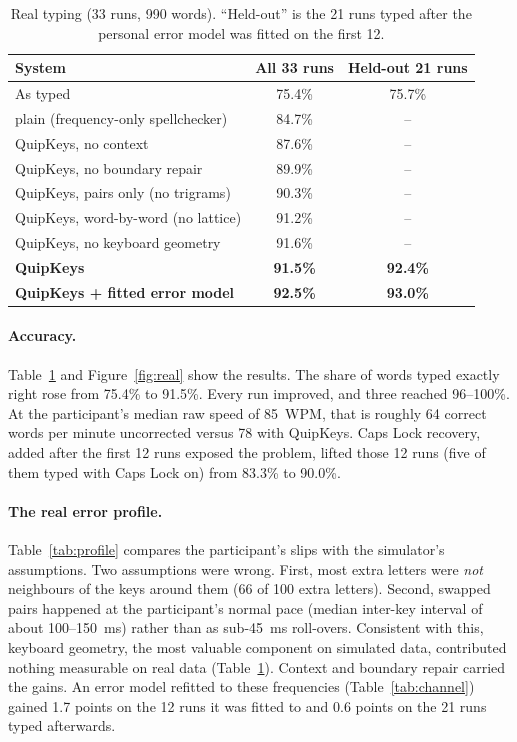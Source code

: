 \documentclass[11pt,a4paper]{article}
\newcommand{\qk}{QuipKeys}
\begin{document}
\begin{table}[t]
\centering\small
\caption{Real typing (33 runs, 990 words). ``Held-out'' is the 21 runs typed after the personal error model was fitted on the first 12.}
\label{tab:real}
\begin{tabular}{lcc}
\toprule
System & All 33 runs & Held-out 21 runs \\
\midrule
As typed & 75.4\% & 75.7\% \\
plain (frequency-only spellchecker) & 84.7\% & -- \\
\qk{}, no context & 87.6\% & -- \\
\qk{}, no boundary repair & 89.9\% & -- \\
\qk{}, pairs only (no trigrams) & 90.3\% & -- \\
\qk{}, word-by-word (no lattice) & 91.2\% & -- \\
\qk{}, no keyboard geometry & 91.6\% & -- \\
\textbf{\qk{}} & \textbf{91.5\%} & \textbf{92.4\%} \\
\textbf{\qk{} + fitted error model} & \textbf{92.5\%} & \textbf{93.0\%} \\
\bottomrule
\end{tabular}
\end{table}

\paragraph{Accuracy.} Table~\ref{tab:real} and Figure~\ref{fig:real} show the results. The share of words typed exactly right rose from 75.4\% to 91.5\%. Every run improved, and three reached 96--100\%. At the participant's median raw speed of 85~WPM, that is roughly 64 correct words per minute uncorrected versus 78 with \qk{}. Caps Lock recovery, added after the first 12 runs exposed the problem, lifted those 12 runs (five of them typed with Caps Lock on) from 83.3\% to 90.0\%.

\paragraph{The real error profile.} Table~\ref{tab:profile} compares the participant's slips with the simulator's assumptions. Two assumptions were wrong. First, most extra letters were \emph{not} neighbours of the keys around them (66 of 100 extra letters). Second, swapped pairs happened at the participant's normal pace (median inter-key interval of about 100--150~ms) rather than as sub-45~ms roll-overs. Consistent with this, keyboard geometry, the most valuable component on simulated data, contributed nothing measurable on real data (Table~\ref{tab:real}). Context and boundary repair carried the gains. An error model refitted to these frequencies (Table~\ref{tab:channel}) gained 1.7 points on the 12 runs it was fitted to and 0.6 points on the 21 runs typed afterwards.
\end{document}
